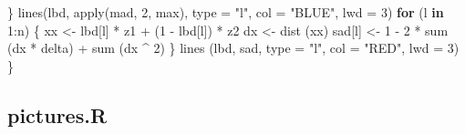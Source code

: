 \documentclass[
  12pt,
]{book}
\newenvironment{Shaded}{\begin{snugshade}}{\end{snugshade}}
\newcommand{\AttributeTok}[1]{\textcolor[rgb]{0.77,0.63,0.00}{#1}}
\newcommand{\ControlFlowTok}[1]{\textcolor[rgb]{0.13,0.29,0.53}{\textbf{#1}}}
\newcommand{\DecValTok}[1]{\textcolor[rgb]{0.00,0.00,0.81}{#1}}
\newcommand{\FunctionTok}[1]{\textcolor[rgb]{0.00,0.00,0.00}{#1}}
\newcommand{\NormalTok}[1]{#1}
\newcommand{\OtherTok}[1]{\textcolor[rgb]{0.56,0.35,0.01}{#1}}
\newcommand{\SpecialCharTok}[1]{\textcolor[rgb]{0.00,0.00,0.00}{#1}}
\newcommand{\StringTok}[1]{\textcolor[rgb]{0.31,0.60,0.02}{#1}}
\theoremstyle{definition}
\theoremstyle{definition}
\theoremstyle{definition}
\theoremstyle{definition}
\theoremstyle{remark}
\begin{document}
\begin{Shaded}
\begin{Highlighting}[]
\NormalTok{  \}}
  \FunctionTok{lines}\NormalTok{(lbd,}
        \FunctionTok{apply}\NormalTok{(mad, }\DecValTok{2}\NormalTok{, max),}
        \AttributeTok{type =} \StringTok{"l"}\NormalTok{,}
        \AttributeTok{col =} \StringTok{"BLUE"}\NormalTok{,}
        \AttributeTok{lwd =} \DecValTok{3}\NormalTok{)}
  \ControlFlowTok{for}\NormalTok{ (l }\ControlFlowTok{in} \DecValTok{1}\SpecialCharTok{:}\NormalTok{n) \{}
\NormalTok{    xx }\OtherTok{\textless{}{-}}\NormalTok{ lbd[l] }\SpecialCharTok{*}\NormalTok{ z1 }\SpecialCharTok{+}\NormalTok{ (}\DecValTok{1} \SpecialCharTok{{-}}\NormalTok{ lbd[l]) }\SpecialCharTok{*}\NormalTok{ z2}
\NormalTok{    dx }\OtherTok{\textless{}{-}} \FunctionTok{dist}\NormalTok{ (xx)}
\NormalTok{    sad[l] }\OtherTok{\textless{}{-}} \DecValTok{1} \SpecialCharTok{{-}} \DecValTok{2} \SpecialCharTok{*} \FunctionTok{sum}\NormalTok{ (dx }\SpecialCharTok{*}\NormalTok{ delta) }\SpecialCharTok{+} \FunctionTok{sum}\NormalTok{ (dx }\SpecialCharTok{\^{}} \DecValTok{2}\NormalTok{)}
\NormalTok{  \}}
  \FunctionTok{lines}\NormalTok{ (lbd,}
\NormalTok{         sad,}
         \AttributeTok{type =} \StringTok{"l"}\NormalTok{,}
         \AttributeTok{col =} \StringTok{"RED"}\NormalTok{,}
         \AttributeTok{lwd =} \DecValTok{3}\NormalTok{)}
\NormalTok{\}}
\end{Highlighting}
\end{Shaded}

\hypertarget{apcodepic}{%
\subsection{pictures.R}\label{apcodepic}}
\end{document}
